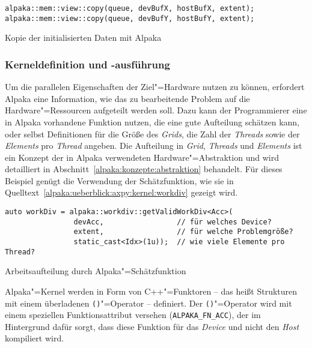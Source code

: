 \begin{code}
    \begin{verbatim}
alpaka::mem::view::copy(queue, devBufX, hostBufX, extent);
alpaka::mem::view::copy(queue, devBufY, hostBufY, extent);
    \end{verbatim}
    \caption{Kopie der initialisierten Daten mit Alpaka}
    \label{alpaka:ueberblick:axpy:buffer:copy}
\end{code}

\subsubsection{Kerneldefinition und -ausführung}
\label{alpaka:ueberblick:axpy:kernel}

Um die parallelen Eigenschaften der Ziel"=Hardware nutzen zu können, erfordert
Alpaka eine Information, wie das zu bearbeitende Problem auf die
Hardware"=Ressourcen aufgeteilt werden soll. Dazu kann der Programmierer eine
in Alpaka vorhandene Funktion nutzen, die eine gute Aufteilung schätzen kann,
oder selbst Definitionen für die Größe des \textit{Grids}, die Zahl der
\textit{Threads} sowie der \textit{Elements} pro \textit{Thread} angeben. Die
Aufteilung in \textit{Grid}, \textit{Threads} und \textit{Elements} ist ein
Konzept der in Alpaka verwendeten Hardware"=Abstraktion und wird detailliert in
Abschnitt~\ref{alpaka:konzepte:abstraktion} behandelt. Für dieses Beispiel
genügt die Verwendung der Schätzfunktion, wie sie in
Quelltext~\ref{alpaka:ueberblick:axpy:kernel:workdiv} gezeigt wird.

\begin{code}
    \begin{verbatim}
auto workDiv = alpaka::workdiv::getValidWorkDiv<Acc>(
                devAcc,                 // für welches Device?
                extent,                 // für welche Problemgröße?
                static_cast<Idx>(1u));  // wie viele Elemente pro Thread?
    \end{verbatim}
    \caption{Arbeitsaufteilung durch Alpaka"=Schätzfunktion}
    \label{alpaka:ueberblick:axpy:kernel:workdiv}
\end{code}

Alpaka"=Kernel werden in Form von C++"=Funktoren -- das heißt Strukturen mit
einem überladenen \texttt{()}"=Operator -- definiert. Der \texttt{()}"=Operator
wird mit einem speziellen Funktionsattribut versehen (\texttt{ALPAKA\_FN\_ACC}),
der im Hintergrund dafür sorgt, dass diese Funktion für das \textit{Device} und
nicht den \textit{Host} kompiliert wird.

